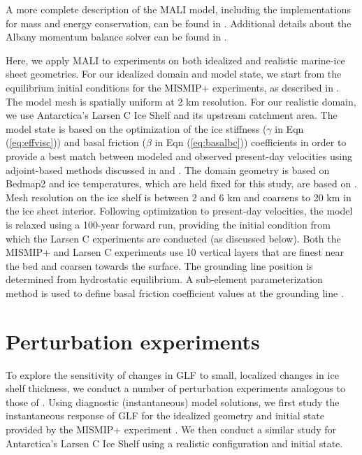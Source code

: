 \documentclass[tc, manuscript]{copernicus}
\begin{document}
A more complete description of the MALI model, including the implementations for mass and energy conservation, can be found in \citet{hoffman2018}. Additional details about the Albany momentum balance solver can be found in \citet{tezaur2015a,tezaur2015b}. 

Here, we apply MALI to experiments on both idealized and realistic marine-ice sheet geometries. For our idealized domain and model state, we start from the equilibrium initial conditions for the MISMIP+ experiments, as described in \citet{asay2016}. The model mesh is spatially uniform at 2 km resolution. For our realistic domain, we use Antarctica's Larsen C Ice Shelf and its upstream catchment area. The model state is based on the optimization of the ice stiffness ($\gamma$ in Eqn (\ref{eq:effvisc})) and basal friction ($\beta$ in Eqn (\ref{eq:basalbc})) coefficients in order to provide a best match between modeled and observed present-day velocities \citep{rignot2014} using adjoint-based methods discussed in \citet{perego2014} and \citet{hoffman2018}. The domain geometry is based on Bedmap2 \citep{fretwell2013} and ice temperatures, which are held fixed for this study, are based on \citet{liefferinge2013}. Mesh resolution on the ice shelf is between 2 and 6 km and coarsens to 20 km in the ice sheet interior. Following optimization to present-day velocities, the model is relaxed using a 100-year forward run, providing the initial condition from which the Larsen C experiments are conducted (as discussed below). Both the MISMIP+ and Larsen C experiments use 10 vertical layers that are finest near the bed and coarsen towards the surface. The grounding line position is determined from hydrostatic equilibrium. A sub-element parameterization method is used to define basal friction coefficient values at the grounding line \citep{seroussi2014} . 


\section{Perturbation experiments}

To explore the sensitivity of changes in GLF to small, localized changes in ice shelf thickness, we conduct a number of perturbation experiments analogous to those of \citet{reese2018}. Using diagnostic (instantaneous) model solutions, we first study the instantaneous response of GLF for the idealized geometry and initial state provided by the MISMIP+ experiment \citep{asay2016}. We then conduct a similar study for Antarctica's Larsen C Ice Shelf using a realistic configuration and initial state. 
\end{document}
